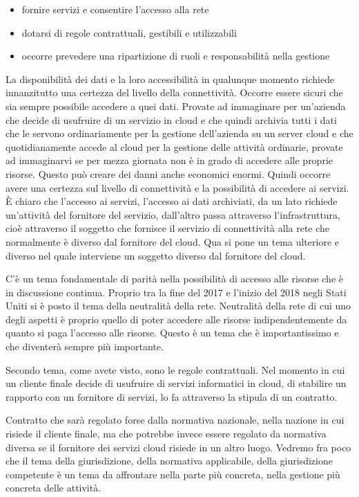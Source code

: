\begin{itemize}
    \item fornire servizi e consentire l'accesso alla rete
    \item dotarsi di regole contrattuali, gestibili e utilizzabili
    \item occorre prevedere una ripartizione di ruoli e responsabilità nella gestione
\end{itemize}


La disponibilità dei dati e la loro accessibilità in qualunque momento richiede innanzitutto una certezza del livello della connettività. Occorre essere sicuri che sia sempre possibile accedere a quei dati. Provate ad immaginare per un'azienda che decide di usufruire di un servizio in cloud e che quindi archivia tutti i dati che le servono ordinariamente per la gestione dell'azienda su un server cloud e che quotidianamente accede al cloud per la gestione delle attività ordinarie, provate ad immaginarvi se per mezza giornata non è in grado di accedere alle proprie risorse. Questo può creare dei danni anche economici enormi. Quindi occorre avere una certezza sul livello di connettività e la possibilità di accedere ai servizi. È chiaro che l'accesso ai servizi, l'accesso ai dati archiviati, da un lato richiede un'attività del fornitore del servizio, dall'altro passa attraverso l'infrastruttura, cioè attraverso il soggetto che fornisce il servizio di connettività alla rete che normalmente è diverso dal fornitore del cloud. Qua si pone un tema ulteriore e diverso nel quale interviene un soggetto diverso dal fornitore del cloud. 

C'è un tema fondamentale di parità nella possibilità di accesso alle risorse che è in discussione continua. Proprio tra la fine del 2017 e l'inizio del 2018 negli Stati Uniti si è posto il tema della neutralità della rete. Neutralità della rete di cui uno degli aspetti è proprio quello di poter accedere alle risorse indipendentemente da quanto si paga l'accesso alle risorse. Questo è un tema che è importantissimo e che diventerà sempre più importante. 

Secondo tema, come avete visto, sono le regole contrattuali. Nel momento in cui un cliente finale decide di usufruire di servizi informatici in cloud,  di stabilire un rapporto con un fornitore di servizi, lo fa attraverso la stipula di un contratto. 

Contratto che sarà regolato forse dalla normativa nazionale, nella nazione in cui risiede il cliente finale, ma che potrebbe invece essere regolato da normativa diversa se il fornitore dei servizi cloud risiede in un altro luogo. Vedremo fra poco che il tema della giurisdizione, della normativa applicabile, della giurisdizione competente è un tema da affrontare nella parte più concreta, nella gestione più concreta delle attività. 


